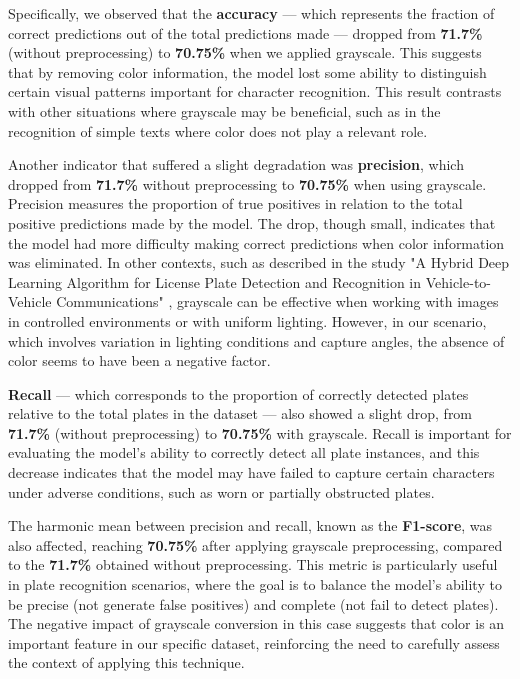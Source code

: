 \documentclass[conference]{IEEEtran}
\begin{document}
    Specifically, we observed that the \textbf{accuracy} — which represents the fraction of correct predictions out of the total predictions made — dropped from \textbf{71.7\%} (without preprocessing) to \textbf{70.75\%} when we applied grayscale. This suggests that by removing color information, the model lost some ability to distinguish certain visual patterns important for character recognition. This result contrasts with other situations where grayscale may be beneficial, such as in the recognition of simple texts where color does not play a relevant role.
    
    Another indicator that suffered a slight degradation was \textbf{precision}, which dropped from \textbf{71.7\%} without preprocessing to \textbf{70.75\%} when using grayscale. Precision measures the proportion of true positives in relation to the total positive predictions made by the model. The drop, though small, indicates that the model had more difficulty making correct predictions when color information was eliminated. In other contexts, such as described in the study "A Hybrid Deep Learning Algorithm for License Plate Detection and Recognition in Vehicle-to-Vehicle Communications" \cite{b7}, grayscale can be effective when working with images in controlled environments or with uniform lighting. However, in our scenario, which involves variation in lighting conditions and capture angles, the absence of color seems to have been a negative factor.
    
    \textbf{Recall} — which corresponds to the proportion of correctly detected plates relative to the total plates in the dataset — also showed a slight drop, from \textbf{71.7\%} (without preprocessing) to \textbf{70.75\%} with grayscale. Recall is important for evaluating the model's ability to correctly detect all plate instances, and this decrease indicates that the model may have failed to capture certain characters under adverse conditions, such as worn or partially obstructed plates.
    
    The harmonic mean between precision and recall, known as the \textbf{F1-score}, was also affected, reaching \textbf{70.75\%} after applying grayscale preprocessing, compared to the \textbf{71.7\%} obtained without preprocessing. This metric is particularly useful in plate recognition scenarios, where the goal is to balance the model's ability to be precise (not generate false positives) and complete (not fail to detect plates). The negative impact of grayscale conversion in this case suggests that color is an important feature in our specific dataset, reinforcing the need to carefully assess the context of applying this technique.
    
\end{document}
